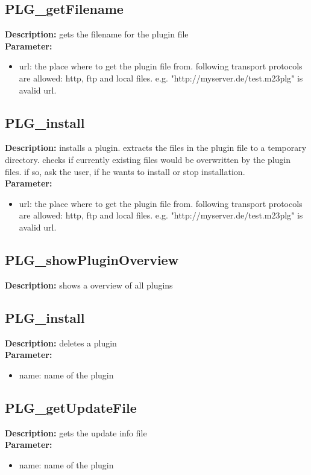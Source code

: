 \subsection{PLG\_getFilename}
\textbf{Description:} gets the filename for the plugin file\\
\textbf{Parameter:}
\begin{itemize}
\item url: the place where to get the plugin file from. following transport protocols are allowed: http, ftp and local files. e.g. "http://myserver.de/test.m23plg" is avalid url.
\end{itemize}

\subsection{PLG\_install}
\textbf{Description:} installs a plugin. extracts the files in the plugin file to a temporary directory. checks if currently existing files would be overwritten by the plugin files. if so, ask the user, if he wants to install or stop installation.\\
\textbf{Parameter:}
\begin{itemize}
\item url: the place where to get the plugin file from. following transport protocols are allowed: http, ftp and local files. e.g. "http://myserver.de/test.m23plg" is avalid url.
\end{itemize}

\subsection{PLG\_showPluginOverview}
\textbf{Description:} shows a overview of all plugins\\

\subsection{PLG\_install}
\textbf{Description:} deletes a plugin\\
\textbf{Parameter:}
\begin{itemize}
\item name: name of the plugin
\end{itemize}

\subsection{PLG\_getUpdateFile}
\textbf{Description:} gets the update info file\\
\textbf{Parameter:}
\begin{itemize}
\item name: name of the plugin
\end{itemize}

